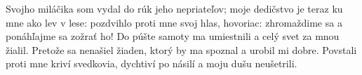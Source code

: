 Svojho miláčika som vydal do rúk jeho nepriateľov;
moje dedičstvo je teraz ku mne
ako lev v lese:
pozdvihlo proti mne svoj hlas, hovoriac:
zhromaždime sa a ponáhľajme sa zožrať ho!
Do púšte samoty ma umiestnili a celý svet za mnou žialil. 
\versseparator
Pretože sa nenašiel žiaden, ktorý by ma spoznal a urobil mi dobre.
\versseparator
Povstali proti mne kriví svedkovia, dychtiví po násilí a moju dušu neušetrili.